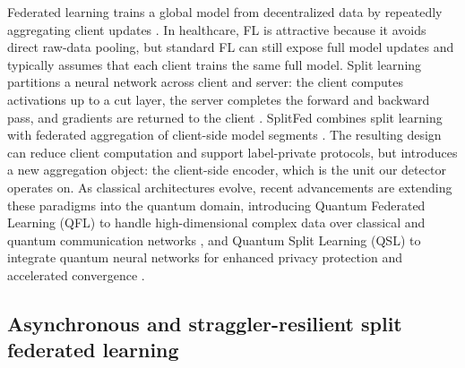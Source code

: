 \documentclass[pdflatex,sn-mathphys-num]{sn-jnl}
\begin{document}
Federated learning trains a global model from decentralized data by repeatedly aggregating client updates \cite{mcmahan2017communication}. In healthcare, FL is attractive because it avoids direct raw-data pooling, but standard FL can still expose full model updates and typically assumes that each client trains the same full model. Split learning partitions a neural network across client and server: the client computes activations up to a cut layer, the server completes the forward and backward pass, and gradients are returned to the client \cite{vepakomma2018split}. SplitFed combines split learning with federated aggregation of client-side model segments \cite{thapa2022splitfed}. The resulting design can reduce client computation and support label-private protocols, but introduces a new aggregation object: the client-side encoder, which is the unit our detector operates on. As classical architectures evolve, recent advancements are extending these paradigms into the quantum domain, introducing Quantum Federated Learning (QFL) to handle high-dimensional complex data over classical and quantum communication networks \cite{chehimi2024foundations}, and Quantum Split Learning (QSL) to integrate quantum neural networks for enhanced privacy protection and accelerated convergence \cite{yun2022quantum}.


\subsection{Asynchronous and straggler-resilient split federated learning}
\end{document}
